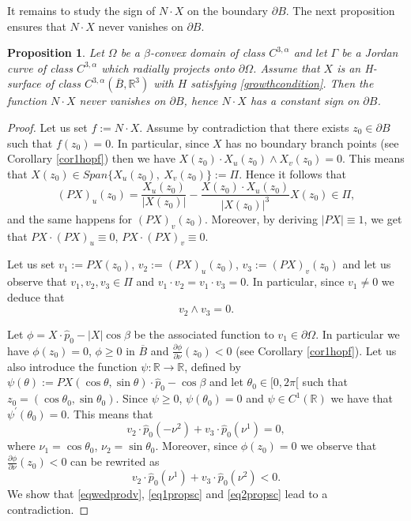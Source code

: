 \documentclass[a4paper,reqno,10pt,oneside]{amsart}
\numberwithin{equation}{section}
\newtheorem{proposition}[theorem]{Proposition}
\begin{document}
It remains to study the sign of $N \cdot X$ on the boundary $\partial B$. The next proposition ensures that $N\cdot X$ never vanishes on $\partial B$. 

\begin{proposition}\label{propcostsign}
Let $\Omega$ be a $\beta$-convex domain of class $C^{3,\alpha}$ and let $\Gamma$ be a Jordan curve of class $C^{3,\alpha}$ which radially projects onto $\partial \Omega$. Assume that $X$ is an H-surface of class $C^{3,\alpha}(\overline B, {\mathbb R}^3)$ with $H$ satisfying \eqref{growthcondition}. Then the function $N\cdot X$ never vanishes on $\partial B$, hence  $N\cdot X$ has a constant sign on $\partial B$.
\end{proposition}

\begin{proof}
Let us set $f:=N\cdot X$. Assume by contradiction that there exists $z_0 \in \partial B$ such that $f(z_0)=0$. In particular, since $X$ has no boundary branch points (see Corollary \ref{cor1hopf}) then we have $X(z_0) \cdot X_u(z_0)\wedge X_v(z_0)=0$. This means that $X(z_0) \in Span \{ X_u(z_0),\ X_v(z_0)\}:=\Pi$. Hence it follows that
$$(PX)_u(z_0) = \frac{X_u(z_0)}{|X(z_0)|} - \frac{X(z_0) \cdot X_u(z_0)}{|X(z_0)|^3} X(z_0)  \in \Pi,$$
and the same happens for $(PX)_v(z_0)$. Moreover, by deriving $|PX|\equiv 1$, we get that $PX \cdot (PX)_u \equiv 0$, $PX \cdot (PX)_v \equiv 0$. 

Let us set $v_1:=PX(z_0)$, $v_2:=(PX)_u(z_0)$, $v_3:=(PX)_v(z_0)$ and let us observe that $v_1,v_2, v_3 \in \Pi$ and $v_1 \cdot v_2=v_1\cdot v_3=0$. In particular, since $v_1\neq 0$ we deduce that 
\begin{equation}\label{eqwedprodv}
v_2 \wedge v_3 =0.
\end{equation}

Let $\phi=X \cdot \hat p_0 - |X| \cos \beta$ be the associated function to $v_1 \in \partial \Omega$. In particular we have $\phi(z_0)=0$, $\phi \geq 0$ in $\overline{B}$ and $\frac{\partial \phi}{\partial \nu}(z_0) <0$ (see Corollary \ref{cor1hopf}). Let us also introduce the function $\psi\colon{\mathbb R} \to {\mathbb R}$, defined by $\psi(\theta):=PX(\cos \theta, \sin \theta) \cdot \hat p_0 - \cos \beta$ and let $\theta_0 \in [0,2 \pi[$ such that $z_0=(\cos \theta_0, \sin \theta_0)$. Since $\psi\geq 0$, $\psi(\theta_0)=0$ and $\psi \in C^1({\mathbb R})$ we have that $\psi^\prime (\theta_0)=0$. This means that 
\begin{equation}\label{eq1propsc}
v_2\cdot \hat p_0 (-\nu^2) + v_3 \cdot \hat p_0 (\nu^1) =0, 
\end{equation}
where $\nu_1=\cos \theta_0$, $\nu_2=\sin \theta_0$. Moreover, since $\phi(z_0)=0$ we observe that $\frac{\partial \phi}{\partial \nu}(z_0) <0$ can be rewrited as
\begin{equation}\label{eq2propsc}
v_2\cdot \hat p_0 (\nu^1) + v_3\cdot \hat p_0 (\nu^2) < 0.
\end{equation}
We show that \eqref{eqwedprodv}, \eqref{eq1propsc} and \eqref{eq2propsc} lead to a contradiction.


\end{proof}
\end{document}
